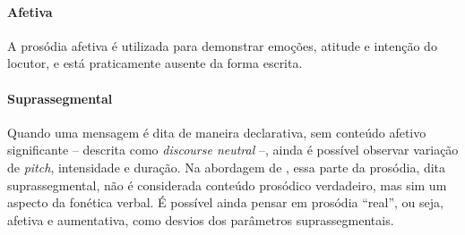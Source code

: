 \paragraph{Afetiva} A prosódia afetiva é utilizada para demonstrar emoções,
atitude e intenção do locutor, e está praticamente ausente da forma escrita.

\paragraph{Suprassegmental} Quando uma mensagem é dita de maneira declarativa,
sem conteúdo afetivo significante -- descrita como \emph{discourse neutral} --,
ainda é possível observar variação de \emph{pitch}, intensidade e duração. Na
abordagem de , essa parte da prosódia, dita
suprassegmental, não é considerada conteúdo prosódico verdadeiro, mas sim um
aspecto da fonética verbal. É possível ainda pensar em prosódia ``real'', ou
seja, afetiva e aumentativa, como desvios dos parâmetros suprassegmentais.

